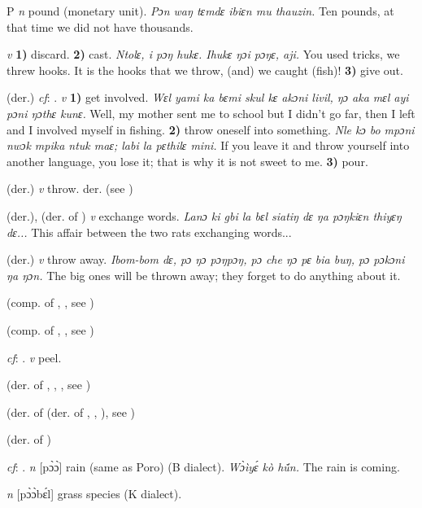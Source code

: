 \begin{letter}{P}
 \textit{n} pound (monetary unit). \textit{Pɔn waŋ tɛmdɛ ibiɛn mu thauzin.} Ten pounds, at that time we did not have thousands.

 \textit{v} \textbf{1)} discard. \textbf{2)} cast. \textit{Ntolɛ, i pɔŋ hukɛ. Ihukɛ ŋɔi pɔŋɛ, aji.} You used tricks, we threw hooks. It is the hooks that we throw, (and) we caught (fish)! \textbf{3)} give out.

 (der.) \textit{cf}: . \textit{v} \textbf{1)} get involved. \textit{Wɛl yami ka bɛmi skul kɛ akɔni livil, ŋɔ aka mɛl ayi pɔni ŋɔthɛ kunɛ.} Well, my mother sent me to school but I didn't go far, then I left and I involved myself in fishing. \textbf{2)} throw oneself into something. \textit{Nle kɔ bo mpɔni nwɔk mpika ntuk maɛ; labi la pɛthilɛ mini.} If you leave it and throw yourself into another language, you lose it; that is why it is not sweet to me. \textbf{3)} pour.

 (der.) \textit{v} throw. der.  (see )

 (der.), (der. of ) \textit{v} exchange words. \textit{Lanɔ ki gbi la bɛl siatiŋ dɛ ŋa pɔŋkiɛn thiyɛŋ dɛ...} This affair between the two rats exchanging words...

 (der.) \textit{v} throw away. \textit{Ibom-bom dɛ, pɔ ŋɔ pɔŋpɔŋ, pɔ che ŋɔ pɛ bia buŋ, pɔ pɔkɔni ŋa ŋɔn.} The big ones will be thrown away; they forget to do anything about it.

 (comp. of , , see ) 

 (comp. of , , see ) 

 \textit{cf}: . \textit{v} peel.

 (der. of , , , see )

 (der. of  (der. of , , ), see ) 

 (der. of ) 

 \textit{cf}: . \textit{n} [pɔ̀ɔ̀] rain (same as Poro) (B dialect). \textit{Wɔ̀ìyɛ́ kò hṹn.} The rain is coming.

 \textit{n} [pɔ̀ɔ̀bɛ́l] grass species (K dialect). 


\end{letter}
